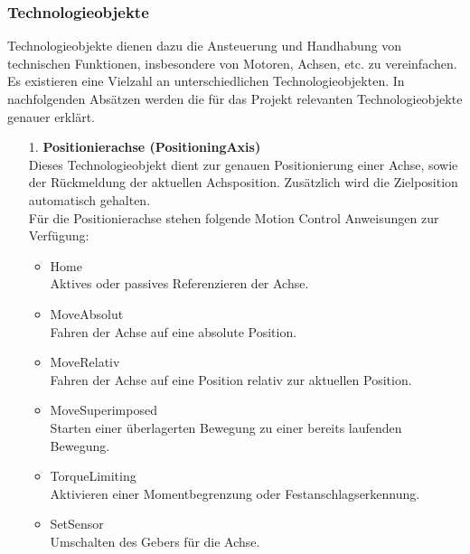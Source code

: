     \subsubsection[Technologieobjekte]{Technologieobjekte \cite{Technologieobjekte}}
    Technologieobjekte dienen dazu die Ansteuerung und Handhabung von technischen Funktionen, insbesondere von Motoren, Achsen, etc. zu vereinfachen. Es existieren eine Vielzahl an unterschiedlichen Technologieobjekten. In nachfolgenden Absätzen werden die für das Projekt relevanten Technologieobjekte genauer erklärt.

    \begin{itemize}

        \item[1.] \textbf{Positionierachse (PositioningAxis)} \\
            Dieses Technologieobjekt dient zur genauen Positionierung einer Achse, sowie der Rückmeldung der aktuellen Achsposition. Zusätzlich wird die Zielposition automatisch gehalten. \\
            Für die Positionierachse stehen folgende Motion Control Anweisungen zur Verfügung: 
            \begin{itemize}
                \item Home \\
                    Aktives oder passives Referenzieren der Achse.
                \item MoveAbsolut \\
                    Fahren der Achse auf eine absolute Position.
                \item MoveRelativ \\
                    Fahren der Achse auf eine Position relativ zur aktuellen Position.
                \item MoveSuperimposed \\
                    Starten einer überlagerten Bewegung zu einer bereits laufenden Bewegung.
                \item TorqueLimiting \\
                    Aktivieren einer Momentbegrenzung oder Festanschlagserkennung.
                \item SetSensor \\
                    Umschalten des Gebers für die Achse. 
            \end{itemize}
            


\end{itemize}
